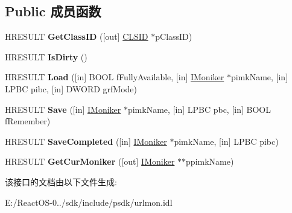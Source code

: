 \subsection*{Public 成员函数}
\begin{DoxyCompactItemize}
\item 
\mbox{\label{interface_i_persist_moniker_aad4ab6993096486637b4ed1d748faec8}} 
H\+R\+E\+S\+U\+LT {\bfseries Get\+Class\+ID} (\mbox{[}out\mbox{]} \hyperlink{struct___i_i_d}{C\+L\+S\+ID} $\ast$p\+Class\+ID)
\item 
\mbox{\label{interface_i_persist_moniker_a05d7aabe0d9a8cbcf1620a3b881fba6e}} 
H\+R\+E\+S\+U\+LT {\bfseries Is\+Dirty} ()
\item 
\mbox{\label{interface_i_persist_moniker_aabd36c7d07bae5ce58892f8cc7097e32}} 
H\+R\+E\+S\+U\+LT {\bfseries Load} (\mbox{[}in\mbox{]} B\+O\+OL f\+Fully\+Available, \mbox{[}in\mbox{]} \hyperlink{interface_i_moniker}{I\+Moniker} $\ast$pimk\+Name, \mbox{[}in\mbox{]} L\+P\+BC pibc, \mbox{[}in\mbox{]} D\+W\+O\+RD grf\+Mode)
\item 
\mbox{\label{interface_i_persist_moniker_abf41223a9ae5909c9d63ce40a2d04261}} 
H\+R\+E\+S\+U\+LT {\bfseries Save} (\mbox{[}in\mbox{]} \hyperlink{interface_i_moniker}{I\+Moniker} $\ast$pimk\+Name, \mbox{[}in\mbox{]} L\+P\+BC pbc, \mbox{[}in\mbox{]} B\+O\+OL f\+Remember)
\item 
\mbox{\label{interface_i_persist_moniker_afab1971044580a83909bf9defac6a86d}} 
H\+R\+E\+S\+U\+LT {\bfseries Save\+Completed} (\mbox{[}in\mbox{]} \hyperlink{interface_i_moniker}{I\+Moniker} $\ast$pimk\+Name, \mbox{[}in\mbox{]} L\+P\+BC pibc)
\item 
\mbox{\label{interface_i_persist_moniker_a4297f433d6ef9712f0794a54b9d7099d}} 
H\+R\+E\+S\+U\+LT {\bfseries Get\+Cur\+Moniker} (\mbox{[}out\mbox{]} \hyperlink{interface_i_moniker}{I\+Moniker} $\ast$$\ast$ppimk\+Name)
\end{DoxyCompactItemize}


该接口的文档由以下文件生成\+:\begin{DoxyCompactItemize}
\item 
E\+:/\+React\+O\+S-\/0../sdk/include/psdk/urlmon.\+idl\end{DoxyCompactItemize}
